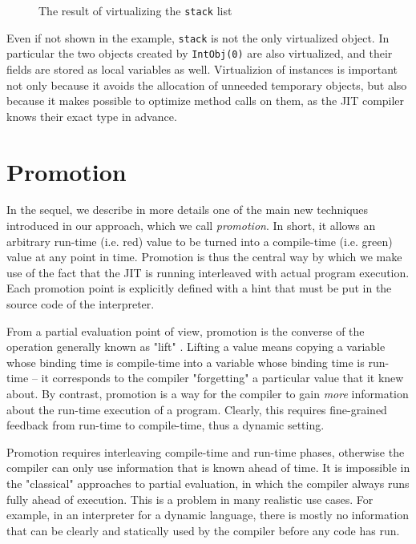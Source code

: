 \begin{figure}[h]
\begin{center}

\caption{The result of virtualizing the \lstinline{stack} list}
\label{fig:tlc-main}
\end{center}
\end{figure}

Even if not shown in the example, \lstinline{stack} is not the only
virtualized object.  In particular the two objects created by
\lstinline{IntObj(0)} are also virtualized, and their fields are stored as
local variables as well.  Virtualizion of instances is important not only
because it avoids the allocation of unneeded temporary objects, but also
because it makes possible to optimize method calls on them, as the JIT
compiler knows their exact type in advance.


\section{Promotion}
\label{sec:promotion}

In the sequel, we describe in more details one of the main new
techniques introduced in our approach, which we call \emph{promotion}.  In
short, it allows an arbitrary run-time (i.e. red) value to be turned into a
compile-time (i.e. green) value at any point in time.  Promotion is thus the central way by
which we make use of the fact that the JIT is running interleaved with actual
program execution. Each promotion point is explicitly defined with a hint that
must be put in the source code of the interpreter.

From a partial evaluation point of view, promotion is the converse of
the operation generally known as "lift" \cite{XXX}.  Lifting a value means
copying a variable whose binding time is compile-time into a variable
whose binding time is run-time – it corresponds to the compiler
"forgetting" a particular value that it knew about.  By contrast,
promotion is a way for the compiler to gain \emph{more} information about
the run-time execution of a program. Clearly, this requires
fine-grained feedback from run-time to compile-time, thus a
dynamic setting.

Promotion requires interleaving compile-time and run-time phases,
otherwise the compiler can only use information that is known ahead of
time. It is impossible in the "classical" approaches to partial
evaluation, in which the compiler always runs fully ahead of execution.
This is a problem in many realistic use cases.  For example, in an
interpreter for a dynamic language, there is mostly no information
that can be clearly and statically used by the compiler before any
code has run.

